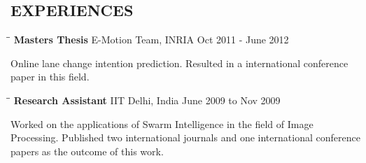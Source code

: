 \documentclass{res}
\begin{document}
\begin{resume}
\section{EXPERIENCES}
\vspace{-0.1in}	
\begin{tabbing}
\hspace{2.3in}\= \hspace{2.6in}\= \kill %
{\bf Masters Thesis} \>E-Motion Team, INRIA \>Oct 2011 - June 2012
		\end{tabbing}\vspace{-18pt}      %
        Online lane change intention prediction. Resulted in a international conference paper in this field.
       \begin{tabbing}%
       \hspace{2.3in}\= \hspace{2.6in}\= \kill %
{\bf Research Assistant}  \>IIT Delhi, India \> June 2009 to Nov 2009

    \end{tabbing}\vspace{-18pt}
    Worked on the applications of Swarm Intelligence in the field of Image Processing. Published two international journals and one international conference papers as the outcome of this work.



\end{resume}
\end{document}
